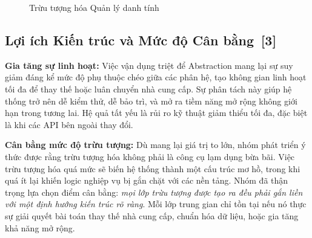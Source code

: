 \documentclass[12pt, a4paper]{article}
\begin{document}
\vspace{-0.2cm}
\begin{figure}[H]
    \centering
    \caption{Trừu tượng hóa Quản lý danh tính}
\end{figure}

\subsection[Lợi ích Kiến trúc và Mức độ Cân bằng]{Lợi ích Kiến trúc và Mức độ Cân bằng \,{\normalfont\small\textcolor{cyan!70!black}{[3]}}}

\noindent\textbf{Gia tăng sự linh hoạt:} Việc vận dụng triệt để Abstraction mang lại sự suy giảm đáng kể mức độ phụ thuộc chéo giữa các phân hệ, tạo không gian linh hoạt tối đa để thay thế hoặc luân chuyển nhà cung cấp. Sự phân tách này giúp hệ thống trở nên dễ kiểm thử, dễ bảo trì, và mở ra tiềm năng mở rộng không giới hạn trong tương lai. Hệ quả tất yếu là rủi ro kỹ thuật giảm thiểu tối đa, đặc biệt là khi các API bên ngoài thay đổi.

\vspace{0.15cm}
\noindent\textbf{Cân bằng mức độ trừu tượng:} Dù mang lại giá trị to lớn, nhóm phát triển ý thức được rằng trừu tượng hóa không phải là công cụ lạm dụng bừa bãi. Việc trừu tượng hóa quá mức sẽ biến hệ thống thành một cấu trúc mơ hồ, trong khi quá ít lại khiến logic nghiệp vụ bị gắn chặt với các nền tảng. Nhóm đã thận trọng lựa chọn điểm cân bằng: \textit{mọi lớp trừu tượng được tạo ra đều phải gắn liền với một định hướng kiến trúc rõ ràng}. Mỗi lớp trung gian chỉ tồn tại nếu nó thực sự giải quyết bài toán thay thế nhà cung cấp, chuẩn hóa dữ liệu, hoặc gia tăng khả năng mở rộng.
\end{document}
